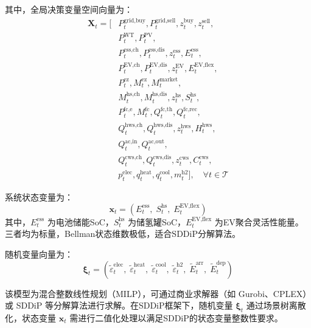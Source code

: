 \documentclass[11pt]{ctexart}
\begin{document}
其中，全局决策变量空间向量为：
\begin{align*}
\mathbf{X}_t = [ &P_{t}^{\text{grid,buy}}, P_{t}^{\text{grid,sell}}, z_{t}^{\text{buy}}, z_{t}^{\text{sell}}, \\
                &P_{t}^{\text{WT}}, P_{t}^{\text{PV}}, \\
                &P_{t}^{\text{ess,ch}}, P_{t}^{\text{ess,dis}}, z_{t}^{\text{ess}}, E_{t}^{\text{ess}}, \\
                &P_{t}^{\text{EV,ch}}, P_{t}^{\text{EV,dis}}, z_{t}^{\text{EV}}, E_{t}^{\text{EV,flex}}, \\
                &P_{t}^{\text{ez}}, M_{t}^{\text{ez}}, M_{t}^{\text{market}}, \\
                &M_{t}^{\text{hs,ch}}, M_{t}^{\text{hs,dis}}, z_{t}^{\text{hs}}, S_{t}^{\text{hs}}, \\
                &P_{t}^{\text{fc,e}}, M_{t}^{\text{fc}}, Q_{t}^{\text{fc,th}}, Q_{t}^{\text{fc,rec}}, \\
                &Q_{t}^{\text{hws,ch}}, Q_{t}^{\text{hws,dis}}, z_{t}^{\text{hws}}, H_{t}^{\text{hws}}, \\
                &Q_{t}^{\text{ac,in}}, Q_{t}^{\text{ac,out}}, \\
                &Q_{t}^{\text{cws,ch}}, Q_{t}^{\text{cws,dis}}, z_{t}^{\text{cws}}, C_{t}^{\text{cws}}, \\
                &p_{t}^{\text{elec}}, q_{t}^{\text{heat}}, q_{t}^{\text{cool}}, m_{t}^{\text{h2}} ], \quad \forall t \in \mathcal{T}
\end{align*}

系统状态变量为：
\begin{equation}
\mathbf{x}_t = \left( E_{t}^{\text{ess}}, \; S_{t}^{\text{hs}}, \; E_{t}^{\text{EV,flex}} \right)
\end{equation}
其中，$E_{t}^{\text{ess}}$ 为电池储能SoC，$S_{t}^{\text{hs}}$ 为储氢罐SoC，$E_{t}^{\text{EV,flex}}$ 为EV聚合灵活性能量。三者均为标量，Bellman状态维数极低，适合SDDiP分解算法。

随机变量向量为：
\begin{equation}
\boldsymbol{\xi}_t = \left( \tilde{\varepsilon}_{t}^{\text{elec}}, \; \tilde{\varepsilon}_{t}^{\text{heat}}, \; \tilde{\varepsilon}_{t}^{\text{cool}}, \; \tilde{\varepsilon}_{t}^{\text{h2}}, \; \tilde{E}_{t}^{\text{arr}}, \; \tilde{E}_{t}^{\text{dep}} \right)
\end{equation}

该模型为混合整数线性规划（MILP），可通过商业求解器（如 Gurobi、CPLEX）或 SDDiP 等分解算法进行求解。在SDDiP框架下，随机变量 $\boldsymbol{\xi}_t$ 通过场景树离散化，状态变量 $\mathbf{x}_t$ 需进行二值化处理以满足SDDiP的状态变量整数性要求。
\end{document}
